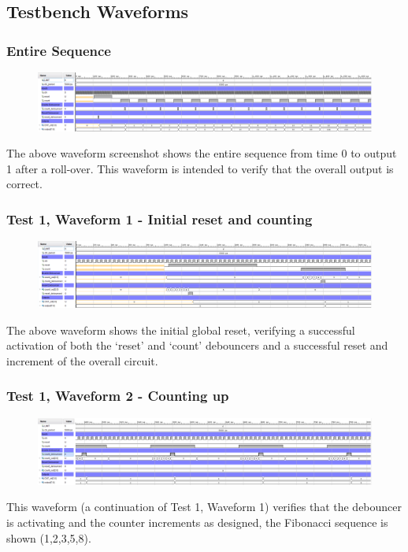 \documentclass[11pt]{report}
\begin{document}
\subsection*{Testbench Waveforms}

\subsubsection*{Entire Sequence}
\begin{figure}[H]
    \includegraphics[width=\columnwidth]{Waveforms/01_entire-sequence.png}
\end{figure}
The above waveform screenshot shows the entire sequence from time 0 to output 1 after a roll-over. This waveform is intended to verify that the overall output is correct.

\subsubsection*{Test 1, Waveform 1 - Initial reset and counting}
\begin{figure}[H]
    \includegraphics[width=\columnwidth]{Waveforms/02_initial-reset-and-counting.png}
\end{figure}
The above waveform shows the initial global reset, verifying a successful activation of both the `reset' and `count' debouncers and a successful reset and increment of the overall circuit. 

\subsubsection*{Test 1, Waveform 2 - Counting up}
\begin{figure}[H]
    \includegraphics[width=\columnwidth]{Waveforms/03_counting-up.png}
\end{figure}
This waveform (a continuation of Test 1, Waveform 1) verifies that the debouncer is activating and the counter increments as designed, the Fibonacci sequence is shown (1,2,3,5,8).
\end{document}

